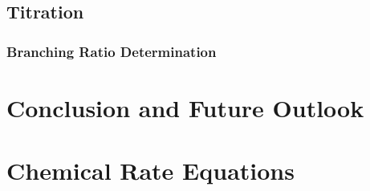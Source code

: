 \documentclass [PhD,nolistoftables,scheader] {uclathes}
\begin{document}
%	

	\section{ Titration}
	
	
		\subsection{Branching Ratio Determination}
		
	
%		

\chapter{Conclusion and Future Outlook}
	

\appendix

\chapter{Chemical Rate Equations}


%




\end{document}

